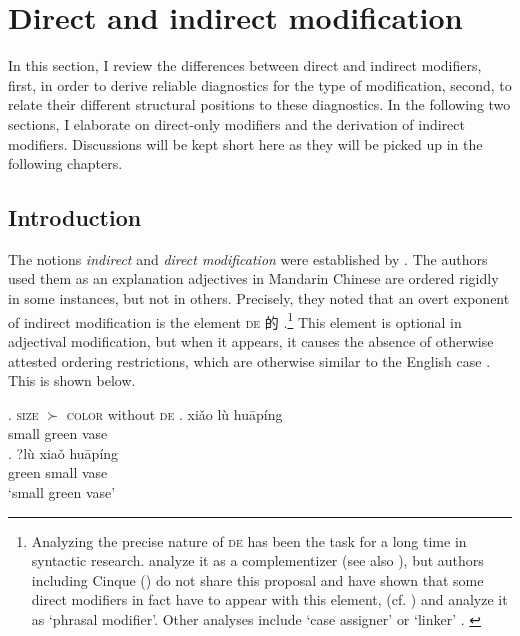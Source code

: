 \documentclass [output=book,colorlinks,citecolor=brown]{langscibook}
\begin{document}
\section{Direct and indirect modification} \label{cartography Cinque}

In this section, I review the differences between direct and indirect modifiers, first, in order to derive reliable diagnostics for the type of modification, second, to relate their different structural positions to these diagnostics. In the following two sections, I elaborate on direct-only modifiers and the derivation of indirect modifiers. Discussions will be kept short here as they will be picked up in the following chapters.

\subsection{Introduction}

The notions \textit{indirect} and \textit{direct modification} were established by \citet{sproat:1991:the}. The authors used them as an explanation adjectives in Mandarin Chinese are ordered rigidly in some instances, but not in others. Precisely, they noted that an overt exponent of indirect modification is the element \textsc{de} 的 \citep[sec. 2]{sproat:1991:the}.\footnote{Analyzing the precise nature of \textsc{de} has been the task for a long time in syntactic research. \citet{sproat:1991:the} analyze it as a complementizer (see also \citealt{gobbo:2010:on}), but authors including Cinque (\citeyear{cinque:2010:adj}) do not share this proposal and have shown that some direct modifiers in fact have to appear with this element, (cf. \citealt{paul:2005:adj, paul:2010:adj, paul:2012:why, yang:2005:plurality}) and analyze it as `phrasal modifier'. Other analyses include `case assigner' \citep{larson:2009:chinese} or `linker' \citep{dikken:2004:complex}. \label{demandarin}} This element is optional in adjectival modification, but when it appears, it causes the absence of otherwise attested ordering restrictions, which are otherwise similar to the English case \citep[579]{sproat:1991:the}. This is shown below. %

\ex. \textsc{size} $\succ$ \textsc{color} without \textsc{de}
\ag. xi\v{a}o lù huāpíng\\
small green vase\\
\bg. ?lù xia\v{o} huāpíng\\
green small vase\\
`small green vase’ \null \hfill \citep[566]{sproat:1991:the}
\end{document}
